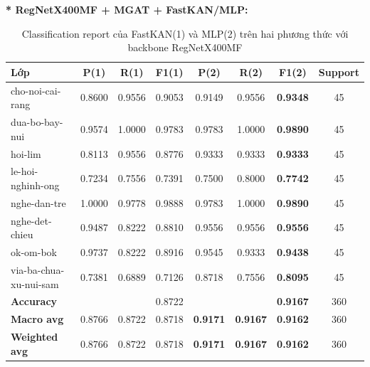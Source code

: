 \textbf{* RegNetX400MF + MGAT + FastKAN/MLP:}
\begin{table}[H]
\centering
\renewcommand{\arraystretch}{1.08}
\caption{\centering Classification report của FastKAN(1) và MLP(2) trên hai phương thức với backbone RegNetX400MF}
\begin{tabular}{lccccccc}
\hline \textbf{Lớp} & \textbf{P(1)} & \textbf{R(1)} & \textbf{F1(1)} & \textbf{P(2)} & \textbf{R(2)} & \textbf{F1(2)} & \textbf{Support} \\ \hline

cho-noi-cai-rang
& 0.8600 & 0.9556 & 0.9053 
& 0.9149 & 0.9556 & \textbf{0.9348} & 45 \\

dua-bo-bay-nui 
& 0.9574 & 1.0000 & 0.9783 
& 0.9783 & 1.0000 & \textbf{0.9890} & 45 \\

hoi-lim 
& 0.8113 & 0.9556 & 0.8776 
& 0.9333 & 0.9333 & \textbf{0.9333} & 45 \\

le-hoi-nghinh-ong
& 0.7234 & 0.7556 & 0.7391 
& 0.7500 & 0.8000 & \textbf{0.7742} & 45 \\

nghe-dan-tre
& 1.0000 & 0.9778 & 0.9888 
& 0.9783 & 1.0000 & \textbf{0.9890} & 45 \\

nghe-det-chieu 
& 0.9487 & 0.8222 & 0.8810 
& 0.9556 & 0.9556 & \textbf{0.9556} & 45 \\

ok-om-bok 
& 0.9737 & 0.8222 & 0.8916 
& 0.9545 & 0.9333 & \textbf{0.9438} & 45 \\

via-ba-chua-xu-nui-sam 
& 0.7381 & 0.6889 & 0.7126 
& 0.8718 & 0.7556 & \textbf{0.8095} & 45 \\
\hline

\textbf{Accuracy}
& & & 0.8722
& & & \textbf{0.9167}  & 360 \\

\textbf{Macro avg} 
& 0.8766 & 0.8722 & 0.8718 
& \textbf{0.9171} & \textbf{0.9167} & \textbf{0.9162} & 360 \\

\textbf{Weighted avg}
& 0.8766 & 0.8722 & 0.8718 
& \textbf{0.9171} & \textbf{0.9167} & \textbf{0.9162} & 360 \\
\hline
\end{tabular}
\end{table}
